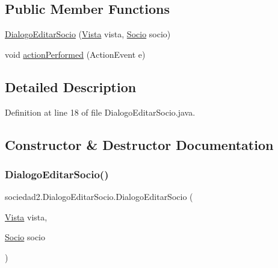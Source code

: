 \subsection*{Public Member Functions}
\begin{DoxyCompactItemize}
\item 
\mbox{\hyperlink{classsociedad2_1_1_dialogo_editar_socio_aa681ec0932e20367719fe2e7773e81fc}{Dialogo\+Editar\+Socio}} (\mbox{\hyperlink{classsociedad2_1_1_vista}{Vista}} vista, \mbox{\hyperlink{classsociedad2_1_1_socio}{Socio}} socio)
\item 
void \mbox{\hyperlink{classsociedad2_1_1_dialogo_editar_socio_ae3b83db83b25b948c323f63d0efe949d}{action\+Performed}} (Action\+Event e)
\end{DoxyCompactItemize}


\subsection{Detailed Description}


Definition at line 18 of file Dialogo\+Editar\+Socio.\+java.



\subsection{Constructor \& Destructor Documentation}
\mbox{\label{classsociedad2_1_1_dialogo_editar_socio_aa681ec0932e20367719fe2e7773e81fc}} 
\subsubsection{\texorpdfstring{Dialogo\+Editar\+Socio()}{DialogoEditarSocio()}}
{\footnotesize\ttfamily sociedad2.\+Dialogo\+Editar\+Socio.\+Dialogo\+Editar\+Socio (\begin{DoxyParamCaption}\item[{\mbox{\hyperlink{classsociedad2_1_1_vista}{Vista}}}]{vista,  }\item[{\mbox{\hyperlink{classsociedad2_1_1_socio}{Socio}}}]{socio }\end{DoxyParamCaption})}



